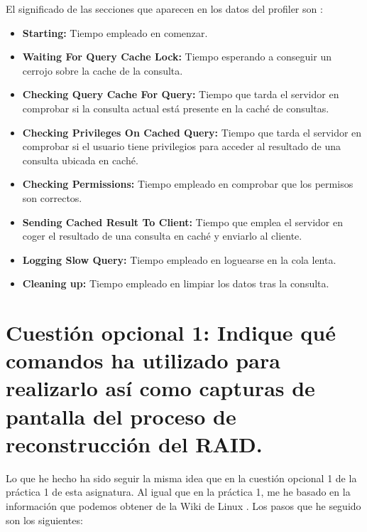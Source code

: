 \documentclass[a4paper,titlepage,12pt]{scrartcl}	%
\numberwithin{figure}{section} %
\numberwithin{table}{section} %
\begin{document}
	El significado de las secciones que aparecen en los datos del profiler son \cite{profilermysql}:
	\begin{itemize}
		\item \textbf{Starting:} Tiempo empleado en comenzar.
		\item \textbf{Waiting For Query Cache Lock:} Tiempo esperando a conseguir un cerrojo sobre la cache de la consulta.
		\item \textbf{Checking Query Cache For Query:} Tiempo que tarda el servidor en comprobar si la consulta actual está presente en la caché de consultas.
		\item \textbf{Checking Privileges On Cached Query:} Tiempo que tarda el servidor en comprobar si el usuario tiene privilegios para acceder al resultado de una consulta ubicada en caché.
		\item \textbf{Checking Permissions:} Tiempo empleado en comprobar que los permisos son correctos.
		\item \textbf{Sending Cached Result To Client:} Tiempo que emplea el servidor en coger el resultado de una consulta en caché y enviarlo al cliente.
		\item \textbf{Logging Slow Query:} Tiempo empleado en loguearse en la cola lenta.
		\item \textbf{Cleaning up:} Tiempo empleado en limpiar los datos tras la consulta.
	\end{itemize}
	
	\section[Cuestión opcional 1: Indique qué comandos ha utilizado para realizarlo así	como capturas de pantalla del proceso de reconstrucción del RAID.]{Cuestión opcional 1: Indique qué comandos ha utilizado para realizarlo así	como capturas de pantalla del proceso de reconstrucción del RAID.}
	
	Lo que he hecho ha sido seguir la misma idea que en la cuestión opcional 1 de la práctica 1 de esta asignatura. Al igual que en la práctica 1, me he basado en la información que podemos obtener de la Wiki de Linux \cite{raid}. Los pasos que he seguido son los siguientes:
	
\end{document}
